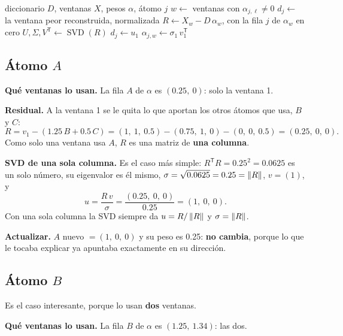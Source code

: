 \documentclass[11pt,letterpaper]{article}
\newcommand{\T}{^{\mathsf{T}}}
\newcommand{\raiz}[1]{\sqrt{#1}}
\begin{document}
\begin{algorithm}[H]
\caption{Actualización del átomo $j$}
\begin{algorithmic}[1]
    \Require diccionario $D$, ventanas $X$, pesos $\alpha$, átomo $j$
    \State $w \gets$ ventanas con $\alpha_{j,\ell} \neq 0$
        \State $d_j \gets$ la ventana peor reconstruida, normalizada
        \State \Return
    \EndIf
    \State $R \gets X_w - D\,\alpha_w$, con la fila $j$ de $\alpha_w$
           en cero 
    \State $U, \Sigma, V\T \gets \operatorname{SVD}(R)$
    \State $d_j \gets u_1$
    \State $\alpha_{j, w} \gets \sigma_1\, v_1\T$
\end{algorithmic}
\end{algorithm}

\subsection*{Átomo $A$}

\textbf{Qué ventanas lo usan.} La fila $A$ de $\alpha$ es
$(0.25,\ 0)$: solo la ventana 1.

\textbf{Residual.} A la ventana 1 se le quita lo que aportan los otros
átomos que usa, $B$ y $C$:
\[
    R = v_1 - (1.25\, B + 0.5\, C)
      = (1,\ 1,\ 0.5) - (0.75,\ 1,\ 0) - (0,\ 0,\ 0.5)
      = (0.25,\ 0,\ 0) .
\]
Como solo una ventana usa $A$, $R$ es una matriz de \textbf{una
columna}.

\textbf{SVD de una sola columna.} Es el caso más simple:
$R\T R = 0.25^2 = 0.0625$ es un solo número, su eigenvalor es él mismo,
$\sigma = \raiz{0.0625} = 0.25 = \norm{R}$, $v = (1)$, y
\[
    u = \frac{R\, v}{\sigma} = \frac{(0.25,\ 0,\ 0)}{0.25}
      = (1,\ 0,\ 0) .
\]
Con una sola columna la SVD siempre da $u = R / \left\lVert R \right\rVert$ y
$\sigma = \left\lVert R \right\rVert$.

\textbf{Actualizar.} $A$ nuevo $= (1,\ 0,\ 0)$ y su peso es 0.25:
\textbf{no cambia}, porque lo que le tocaba explicar ya apuntaba
exactamente en su dirección.

\subsection*{Átomo $B$}

Es el caso interesante, porque lo usan \textbf{dos} ventanas.

\textbf{Qué ventanas lo usan.} La fila $B$ de $\alpha$ es
$(1.25,\ 1.34)$: las dos.
\end{document}
